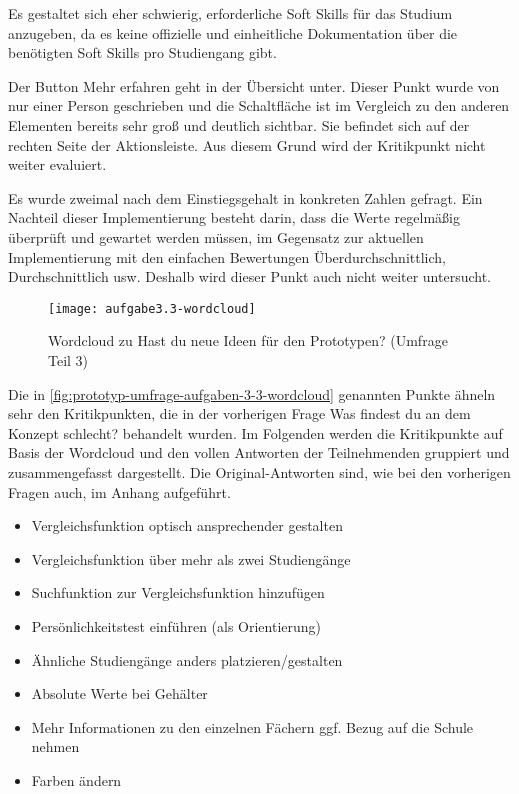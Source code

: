 Es gestaltet sich eher schwierig, erforderliche Soft Skills für das Studium anzugeben, da es keine offizielle und einheitliche Dokumentation über die benötigten Soft Skills pro Studiengang gibt.

Der Button \glqq Mehr erfahren\grqq{} geht in der Übersicht unter. Dieser Punkt wurde von nur einer Person geschrieben und die Schaltfläche ist im Vergleich zu den anderen Elementen bereits sehr groß und deutlich sichtbar. Sie befindet sich auf der rechten Seite der Aktionsleiste. Aus diesem Grund wird der Kritikpunkt nicht weiter evaluiert.

Es wurde zweimal nach dem Einstiegsgehalt in konkreten Zahlen gefragt. Ein Nachteil dieser Implementierung besteht darin, dass die Werte regelmäßig überprüft und gewartet werden müssen, im Gegensatz zur aktuellen Implementierung mit den einfachen Bewertungen \glqq Überdurchschnittlich\grqq{}, \glqq Durchschnittlich\grqq{} usw. Deshalb wird dieser Punkt auch nicht weiter untersucht.

\begin{figure}[H]
    \centering
    \texttt{[image: aufgabe3.3-wordcloud]}
    \caption{Wordcloud zu \glqq Hast du neue Ideen für den Prototypen?\grqq{} (Umfrage Teil 3)}
    \label{fig:prototyp-umfrage-aufgaben-3-3-wordcloud}
\end{figure}

Die in \autoref{fig:prototyp-umfrage-aufgaben-3-3-wordcloud} genannten Punkte ähneln sehr den Kritikpunkten, die in der vorherigen Frage \glqq Was findest du an dem Konzept schlecht?\grqq{} behandelt wurden. Im Folgenden werden die Kritikpunkte auf Basis der Wordcloud und den vollen Antworten der Teilnehmenden gruppiert und zusammengefasst dargestellt. Die Original-Antworten sind, wie bei den vorherigen Fragen auch, im Anhang aufgeführt.


\begin{itemize}
    \item Vergleichsfunktion optisch ansprechender gestalten
    \item Vergleichsfunktion über mehr als zwei Studiengänge
    \item Suchfunktion zur Vergleichsfunktion hinzufügen
    \item Persönlichkeitstest einführen (als Orientierung)
    \item Ähnliche Studiengänge anders platzieren/gestalten
    \item Absolute Werte bei Gehälter
    \item Mehr Informationen zu den einzelnen Fächern ggf. Bezug auf die Schule
    nehmen
    \item Farben ändern
\end{itemize}

